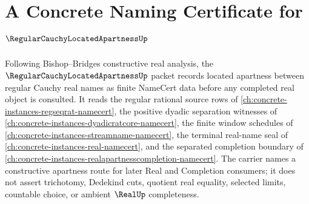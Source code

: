 \chapter{A Concrete Naming Certificate for $\RegularCauchyLocatedApartnessUp$}
\label{ch:concrete-instances-regular-cauchy-located-apartness-namecert}

Following Bishop--Bridges constructive real analysis, the $\RegularCauchyLocatedApartnessUp$ packet records located apartness between regular Cauchy real names as finite NameCert data before any completed real object is consulted. It reads the regular rational source rows of \autoref{ch:concrete-instances-regseqrat-namecert}, the positive dyadic separation witnesses of \autoref{ch:concrete-instances-dyadicratcore-namecert}, the finite window schedules of \autoref{ch:concrete-instances-streamname-namecert}, the terminal real-name seal of \autoref{ch:concrete-instances-real-namecert}, and the separated completion boundary of \autoref{ch:concrete-instances-realapartnesscompletion-namecert}. The carrier names a constructive apartness route for later Real and Completion consumers; it does not assert trichotomy, Dedekind cuts, quotient real equality, selected limits, countable choice, or ambient $\RealUp$ completeness.

